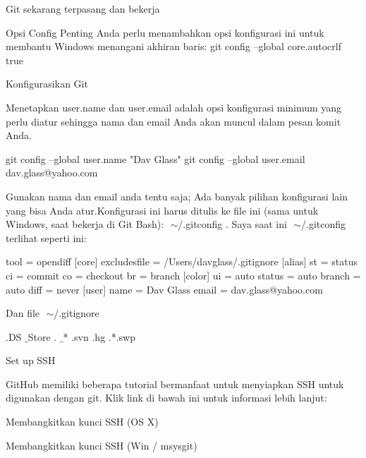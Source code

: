Git sekarang terpasang dan bekerja \par
\vspace{12pt}
\noindent 
Opsi Config Penting $  $Anda perlu menambahkan opsi konfigurasi ini untuk membantu Windows menangani akhiran baris: $  $git config --global core.autocrlf true \par
\vspace{12pt}
\noindent 
 $  $Konfigurasikan Git \par
\vspace{12pt}
\noindent 
Menetapkan $  $user.name $  $dan $  $user.email $  $adalah opsi konfigurasi minimum yang perlu diatur sehingga nama dan email Anda akan muncul dalam pesan komit Anda. \par
\vspace{12pt}
\noindent 
 git config --global user.name "Dav Glass" git config --global user.email dav.glass@yahoo.com  \par
\vspace{12pt}
\noindent 
Gunakan nama dan email anda tentu saja; $  $Ada $  $banyak pilihan konfigurasi lain $  $yang bisa Anda atur.Konfigurasi ini harus ditulis ke file ini (sama untuk Windows, saat bekerja di Git Bash): $  $ $  \sim  $/.gitconfig $  $. $  $Saya saat ini $  $ $  \sim  $/.gitconfig $  $terlihat seperti ini: \par
\vspace{12pt}
\noindent 
 [merge] tool = opendiff [core] excludesfile = /Users/davglass/.gitignore [alias] st = status ci = commit co = checkout br = branch [color] ui = auto status = auto branch = auto diff = never [user] name = Dav Glass email = dav.glass@yahoo.com  \par
\vspace{12pt}
\noindent 
Dan file $  $ $  \sim  $/.gitignore \par
\noindent 
 .DS $  \_  $Store . $  \_  $* .svn .hg .*.swp  \par
\noindent 
 $  $Set up SSH \par
\noindent 
GitHub memiliki beberapa tutorial bermanfaat untuk menyiapkan SSH untuk digunakan dengan git. $  $Klik link di bawah ini untuk informasi lebih lanjut: \par
\vspace{12pt}
\noindent 
Membangkitkan kunci SSH (OS X) \par
\vspace{12pt}
\noindent 
Membangkitkan kunci SSH (Win / msysgit) \par
\vspace{12pt}
